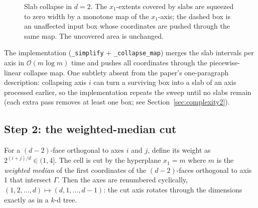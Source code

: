 \documentclass[11pt,a4paper]{article}
\theoremstyle{remark}
\newcommand{\Oh}{\mathcal{O}}
\begin{document}
\begin{figure}[ht]
\centering
{}
\caption{Slab collapse in $d=2$.  The $x_1$-extents covered by slabs are
squeezed to zero width by a monotone map of the $x_1$-axis; the dashed box is
an unaffected input box whose coordinates are pushed through the same map.
The uncovered area is unchanged.}
\label{fig:collapse}
\end{figure}

The implementation (\texttt{\_simplify} + \texttt{\_collapse\_map}) merges the
slab intervals per axis in $\Oh(m\log m)$ time and pushes all coordinates
through the piecewise-linear collapse map.  One subtlety absent from the
paper's one-paragraph description: collapsing axis $i$ can turn a surviving
box into a slab of an axis processed earlier, so the implementation repeats
the sweep until no slabs remain (each extra pass removes at least one box;
see Section~\ref{sec:complexity2}).

\subsection{Step 2: the weighted-median cut}

For a $(d{-}2)$-face orthogonal to axes $i$ and $j$, define its weight as
$2^{(i+j)/d}\in(1,4]$.  The cell is cut by the hyperplane $x_1=m$ where $m$
is the \emph{weighted median} of the first coordinates of the $(d{-}2)$-faces
orthogonal to axis 1 that intersect $\Gamma$.  Then the axes are renumbered
cyclically, $(1,2,\dots,d)\mapsto(d,1,\dots,d-1)$: the cut axis rotates
through the dimensions exactly as in a $k$-d tree.
\end{document}
